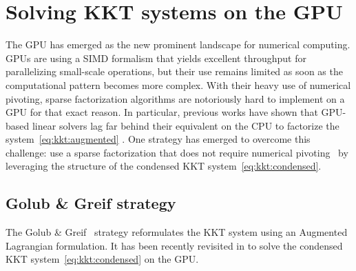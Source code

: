 \section{Solving KKT systems on the GPU}
The GPU has emerged as the new prominent landscape
for numerical computing. GPUs are using a SIMD formalism
that yields excellent throughput for parallelizing small-scale
operations, but their use remains limited as soon as the computational
pattern becomes more complex. With their heavy use of numerical
pivoting, sparse factorization algorithms are notoriously hard to implement
on a GPU for that exact reason. In particular, previous works have
shown that GPU-based linear solvers lag far behind their equivalent
on the CPU to factorize the system~\eqref{eq:kkt:augmented}
\cite{tasseff2019exploring,swirydowicz2021linear}. One strategy
has emerged to overcome this challenge:
use a sparse factorization that does not require numerical pivoting~\cite{regev2023hykkt,shin2023accelerating}
by leveraging the structure of the condensed KKT system~\eqref{eq:kkt:condensed}.

\subsection{Golub \& Greif strategy}
\label{sec:kkt:golubgreif}
The Golub \& Greif~\cite{golub2003solving} strategy reformulates the KKT system
using an Augmented Lagrangian formulation.
It has been recently revisited in \cite{regev2023hykkt}
to solve the condensed KKT system~\eqref{eq:kkt:condensed} on the GPU.

